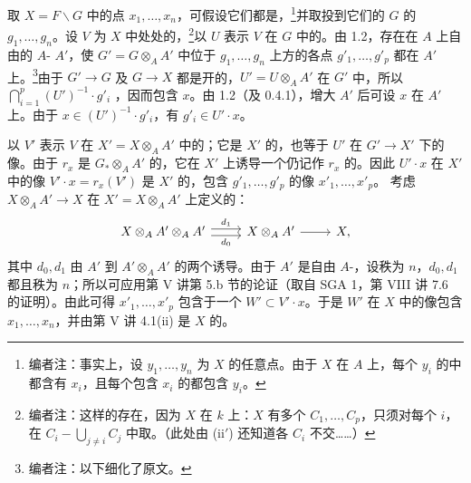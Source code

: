 取 $X=F\backslash G$ 中的点 $x_1,\ldots,x_n$，可假设它们都是，\footnote{编者注：事实上，设 $y_1,\ldots,y_n$ 为 $X$ 的任意点。由于 $X$ 在 $A$ 上，每个 $y_i$ 的中都含有 $x_i$，且每个包含 $x_i$ 的都包含 $y_i$。}并取投到它们的 $G$ 的 $g_1,\ldots,g_n$。设 $V$ 为 $X$ 中处处的，\footnote{编者注：这样的存在，因为 $X$ 在 $k$ 上：$X$ 有多个 $C_1,\ldots,C_p$，只须对每个 $i$，在 $C_i-\bigcup_{j\ne i}C_j$ 中取。（此处由 (ii$'$) 还知道各 $C_i$ 不交……）}以 $U$ 表示 $V$ 在 $G$ 中的。由 1.2，存在在 $A$ 上自由的 $A$- $A'$，使 $G'=G\otimes_A A'$ 中位于 $g_1,\ldots,g_n$ 上方的各点 $g'_1,\ldots,g'_p$ 都在 $A'$ 上。\footnote{编者注：以下细化了原文。}由于 $G'\to G$ 及 $G\to X$ 都是开的，$U'=U\otimes_A A'$ 在 $G'$ 中，所以 $\bigcap_{i=1}^p(U')^{-1}\cdot g'_i$ ，因而包含 $x$。由 1.2（及 0.4.1），增大 $A'$ 后可设 $x$ 在 $A'$ 上。由于 $x\in(U')^{-1}\cdot g'_i$，有 $g'_i\in U'\cdot x$。

以 $V'$ 表示 $V$ 在 $X'=X\otimes_A A'$ 中的；它是 $X'$ 的，也等于 $U'$ 在 $G'\to X'$ 下的像。由于 $r_x$ 是 $G_*\otimes_A A'$ 的，它在 $X'$ 上诱导一个仍记作 $r_x$ 的。因此 $U'\cdot x$ 在 $X'$ 中的像 $V'\cdot x=r_x(V')$ 是 $X'$ 的，包含 $g'_1,\ldots,g'_p$ 的像 $x'_1,\ldots,x'_p$。
考虑 $X\otimes_A A'\to X$ 在 $X'=X\otimes_A A'$ 上定义的：
\[
\begin{tikzcd}
X\otimes_A A'\otimes_A A'\arrow[r,shift left=.6ex,"d_1"]\arrow[r,shift right=.6ex,"d_0"']&X\otimes_A A'\arrow[r]&X,
\end{tikzcd}
\]
其中 $d_0,d_1$ 由 $A'$ 到 $A'\otimes_A A'$ 的两个诱导。由于 $A'$ 是自由 $A$-，设秩为 $n$，$d_0,d_1$ 都且秩为 $n$；所以可应用第 V 讲第 5.b 节的论证（取自 SGA 1，第 VIII 讲 7.6 的证明）。由此可得 $x'_1,\ldots,x'_p$ 包含于一个 $W'\subset V'\cdot x$。于是 $W'$ 在 $X$ 中的像包含 $x_1,\ldots,x_n$，并由第 V 讲 4.1(ii) 是 $X$ 的。

